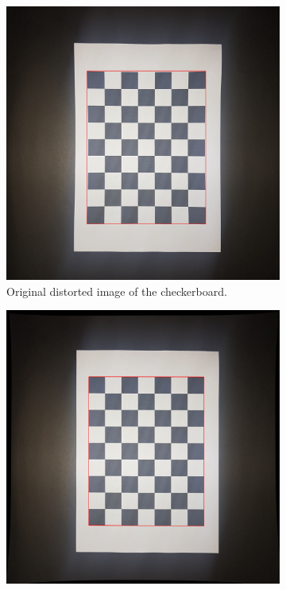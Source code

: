 \begin{figure}[H]
    \centering
    \begin{subfigure}[b]{0.45\textwidth}
        \includegraphics[width=\textwidth]{figures/202106/distorted-checkerboard.png}
        \caption{Original distorted image of the checkerboard.}
        \label{fig:distorted-checkerboard}
    \end{subfigure}
    \begin{subfigure}[b]{0.45\textwidth}
        \includegraphics[width=\textwidth]{figures/202106/undistorted-checkerboard.png}

\end{subfigure}
\end{figure}
